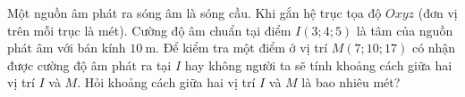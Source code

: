 \begin{ex}%
	Một nguồn âm phát ra sóng âm là sóng cầu. Khi gắn hệ trục tọa độ $O x y z$ (đơn vị trên mỗi trục là mét). Cường độ âm chuẩn tại điểm $I(3 ; 4 ; 5)$ là tâm của nguồn phát âm với bán kính $10 \mathrm{~m}$. Để kiểm tra một điểm ở vị trí $M(7 ; 10 ; 17)$ có nhận được cường độ âm phát ra tại $I$ hay không người ta sẽ tính khoảng cách giữa hai vị trí $I$ và $M$. Hỏi khoảng cách giữa hai vị trí $I$ và $M$ là bao nhiêu mét?
\end{ex}
